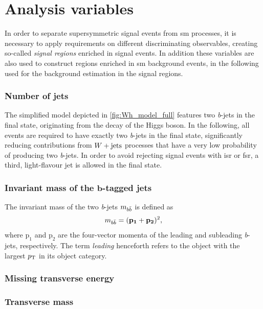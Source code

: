 \section{Analysis variables}

In order to separate supersymmetric signal events from \gls{sm} processes, it is necessary to apply requirements on different discriminating observables, creating so-called \textit{signal regions} enriched in signal events. In addition these variables are also used to construct regions enriched in \gls{sm} background events, in the following used for the background estimation in the signal regions.

\subsubsection{Number of jets}

The simplified model depicted in \cref{fig:Wh_model_full} features two \textit{b}-jets in the final state, originating from the decay of the Higgs boson. In the following, all events are required to have exactly two \textit{b}-jets in the final state, significantly reducing contributions from $W+\mathrm{jets}$ processes that have a very low probability of producing two \textit{b}-jets. In order to avoid rejecting signal events with \gls{isr} or \gls{fsr}, a third, light-flavour jet is allowed in the final state.

\subsubsection[Invariant mass of the \textit{b}-tagged jets]{Invariant mass of the $\boldsymbol{b}$-tagged jets}

The invariant mass of the two \textit{b}-jets $m_{b\bar{b}}$ is defined as
\begin{equation}
	m_{b\bar{b}} = (\boldsymbol{\mathrm{p_1}}+\boldsymbol{\mathrm{p_2}})^2,
\end{equation}
where $\boldsymbol{\mathrm{p_1}}$ and $\boldsymbol{\mathrm{p_2}}$ are the four-vector momenta of the leading and subleading \textit{b}-jets, respectively. The term \textit{leading} henceforth refers to the object with the largest $p_{\textrm{T}}$ in its object category.

\subsubsection{Missing transverse energy}

\subsubsection{Transverse mass}

